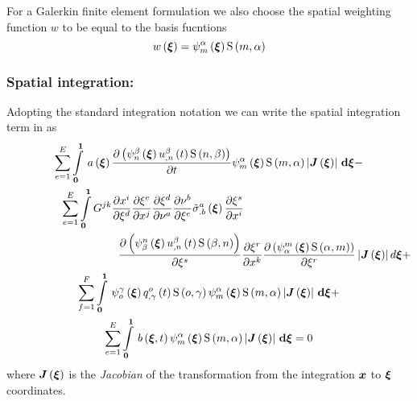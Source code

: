 For a Galerkin finite element formulation we also choose the spatial weighting
function $w$ to be equal to the basis fucntions \ie
\begin{equation}
   w\left( \boldsymbol{\xi} \right) =   \psi_{m}^{\alpha} \left( \boldsymbol{\xi} \right)     \mathrm{S} \left( m,\alpha \right)  
\end{equation}

\subsubsection{Spatial integration:}

Adopting the standard integration notation we can write the spatial
integration term in  as
\begin{multline}
  \dsum_{e=1}^{E}\gint{\vectr{0}}{\vectr{1}}{\fnof{a}{\vectr{\xi}}
    \delby{\pbrac{\gbfn{n}{\beta}{\vectr{\xi}}\fnof{\nodedof{u}{\beta}{n}}{t}
        \gsf{n}{\beta}}}{t}\gbfn{m}{\alpha}{\vectr{\xi}}\gsf{m}{\alpha}
    \abs{\fnof{\matr{J}}{\vectr{\xi}}}}{\vectr{\xi}} - \\
  \dsum_{e=1}^{E}\dintl{\vectr{0}}{\vectr{1}}G^{jk}\delby{x^{i}}{\xi^{d}}\delby{\xi^{e}}{x^{j}}
  \delby{\xi^{d}}{\nu^{a}}\delby{\nu^{b}}{\xi^{e}}\fnof{{\tilde{\sigma}}^{a}_{.b}}{\vectr{\xi}}
  \delby{\xi^{s}}{x^{i}}
  \quad\quad\quad\quad\quad\quad\quad\quad\quad\quad \\ \quad\quad\quad\quad\quad\quad\quad\quad\quad\quad
  \delby{\pbrac{\gbfn{\beta}{n}{\vectr{\xi}}\fnof{\nodedof{u}{\beta}{n}}{t}
      \gsf{\beta}{n}}}{\xi^{s}}\delby{\xi^{r}}{x^{k}}\delby{
    \pbrac{\gbfn{\alpha}{m}{\vectr{\xi}}\gsf{\alpha}{m}}}{\xi^{r}}
  \abs{\fnof{\matr{J}}{\vectr{\xi}}}d\vectr{\xi} + \\
  \dsum_{f=1}^{F}\gint{\vectr{0}}{\vectr{1}}{\gbfn{o}{\gamma}{\vectr{\xi}}
    \fnof{\nodedof{q}{o}{\gamma}}{t}\gsf{o}{\gamma}\gbfn{m}{\alpha}{\vectr{\xi}}
    \gsf{m}{\alpha}\abs{\fnof{\matr{J}}{\vectr{\xi}}}}{\vectr{\xi}} + \\
  \dsum_{e=1}^{E}\gint{\vectr{0}}{\vectr{1}}{\fnof{b}{\vectr{\xi},t}\gbfn{m}{\alpha}{\vectr{\xi}}
    \gsf{m}{\alpha}\abs{\fnof{\matr{J}}{\vectr{\xi}}}}{\vectr{\xi}} = 0
  \label{eqn:diffusionspatialintegration1}
\end{multline}
where $\fnof{\matr{J}}{\vectr{\xi}}$ is the \emph{Jacobian} of the
transformation from the integration $\boldsymbol{x}$ to $\boldsymbol{\xi}$ coordinates.

